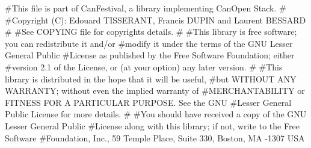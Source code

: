 \documentclass[a4paper,12pt]{book}
\begin{document}
{\ttfamily
\#This file is part of CanFestival, a library implementing CanOpen
Stack. \newline
\# \newline
\#Copyright (C): Edouard TISSERANT, Francis DUPIN and Laurent BESSARD
\newline
\# \newline
\#See COPYING file for copyrights details. \newline
\# \newline
\#This library is free software; you can redistribute it and/or \newline
\#modify it under the terms of the GNU Lesser General Public \newline
\#License as published by the Free Software Foundation; either \newline
\#version 2.1 of the License, or (at your option) any later version.
\newline
\# \newline
\#This library is distributed in the hope that it will be useful,
\newline
\#but WITHOUT ANY WARRANTY; without even the implied warranty of
\newline
\#MERCHANTABILITY or FITNESS FOR A PARTICULAR PURPOSE. \space See the GNU
\newline
\#Lesser General Public License for more details. \newline
\# \newline
\#You should have received a copy of the GNU Lesser General Public
\newline
\#License along with this library; if not, write to the Free Software
\newline
\#Foundation, Inc., 59 Temple Place, Suite 330, Boston, MA
-1307 \space USA }


\bigskip
\end{document}

